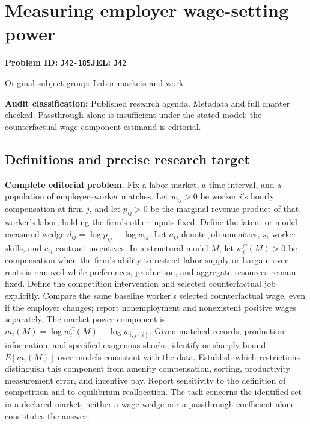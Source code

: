 \documentclass[11pt,a4paper]{article}
\begin{document}
\section*{Measuring employer wage-setting power}
\textbf{Problem ID:} \texttt{J42-185}\quad \textbf{JEL:} \texttt{J42}\par
\label{problem:OP-0350}
{\sffamily\small\color{muted}Original subject group: Labor markets and work\par}
\label{definitions:problem:30007632}
\textbf{Audit classification:} Published research agenda. Metadata and full chapter checked. Passthrough alone is insufficient under the stated model; the counterfactual wage-component estimand is editorial.
\subsection*{Definitions and precise research target}
\textbf{Complete editorial problem.} Fix a labor market, a time interval, and a population of employer--worker matches. Let \(w_{ij}>0\) be worker \(i\)'s hourly compensation at firm \(j\), and let \(p_{ij}>0\) be the marginal revenue product of that worker's labor, holding the firm's other inputs fixed. Define the latent or model-measured wedge \(d_{ij}=\log p_{ij}-\log w_{ij}\). Let \(a_{ij}\) denote job amenities, \(s_i\) worker skills, and \(c_{ij}\) contract incentives. In a structural model \(M\), let \(w^{C}_{i}(M)>0\) be compensation when the firm's ability to restrict labor supply or bargain over rents is removed while preferences, production, and aggregate resources remain fixed. Define the competition intervention and selected counterfactual job explicitly. Compare the same baseline worker's selected counterfactual wage, even if the employer changes; report nonemployment and nonexistent positive wages separately. The market-power component is \(m_i(M)=\log w^{C}_{i}(M)-\log w_{i,j(i)}\). Given matched records, production information, and specified exogenous shocks, identify or sharply bound \(E[m_i(M)]\) over models consistent with the data. Establish which restrictions distinguish this component from amenity compensation, sorting, productivity measurement error, and incentive pay. Report sensitivity to the definition of competition and to equilibrium reallocation. The task concerns the identified set in a declared market; neither a wage wedge nor a passthrough coefficient alone constitutes the answer.
\end{document}
